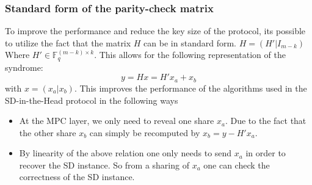 \documentclass[twoside,11pt,openright]{report}
\theoremstyle{definition}
\theoremstyle{plain}
\begin{document}
\subsubsection{Standard form of the parity-check matrix}\label{sec:standard_form_of_the_parity_check_matrix}
To improve the performance and reduce the key size of the protocol, its possible to utilize the fact that the matrix $H$ can be in standard form. $H = (H'|I_{m-k}) $ Where $H' \in \mathbb{F}^{(m-k)\times k}_q$. This allows for the following representation of the syndrome:
\begin{equation}
  y = Hx = H'x_a + x_b
  \label{eq:standard_form_of_the_parity_check_matrix}
\end{equation}
with $x = (x_a | x_b)$. This improves the performance of the algorithms used in the SD-in-the-Head protocol in the following ways
\begin{itemize}
  \item At the MPC layer, we only need to reveal one share $x_a$. Due to the fact that the other share $x_b$ can simply be recomputed by $x_b = y - H'x_a$.
  \item By linearity of the above relation one only needs to send $x_a$ in order to recover the SD instance. So from a sharing of $x_a$ one can check the correctness of the SD instance.
\end{itemize}
\end{document}
